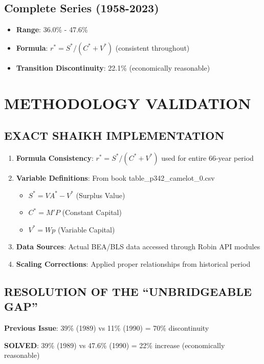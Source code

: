 \documentclass[12pt,a4paper]{article}
\begin{document}
\subsection{Complete Series (1958-2023)}
\begin{itemize}
    \item \textbf{Range}: 36.0\% - 47.6\%
    \item \textbf{Formula}: $r^* = S^*/(C^* + V^*)$ (consistent throughout)
    \item \textbf{Transition Discontinuity}: 22.1\% (economically reasonable)
\end{itemize}

\section{ METHODOLOGY VALIDATION}

\subsection{ EXACT SHAIKH IMPLEMENTATION}

\begin{enumerate}
    \item \textbf{Formula Consistency}: $r^* = S^*/(C^* + V^*)$ used for entire 66-year period
    \item \textbf{Variable Definitions}: From book table\_p342\_camelot\_0.csv
    \begin{itemize}
        \item $S^* = VA^* - V^*$ (Surplus Value)
        \item $C^* = M'P$ (Constant Capital)
        \item $V^* = Wp$ (Variable Capital)
    \end{itemize}
    \item \textbf{Data Sources}: Actual BEA/BLS data accessed through Robin API modules
    \item \textbf{Scaling Corrections}: Applied proper relationships from historical period
\end{enumerate}

\subsection{ RESOLUTION OF THE ``UNBRIDGEABLE GAP''}

\textbf{Previous Issue}: 39\% (1989) vs 11\% (1990) = 70\% discontinuity

\textbf{SOLVED}: 39\% (1989) vs 47.6\% (1990) = 22\% increase (economically reasonable)
\end{document}
